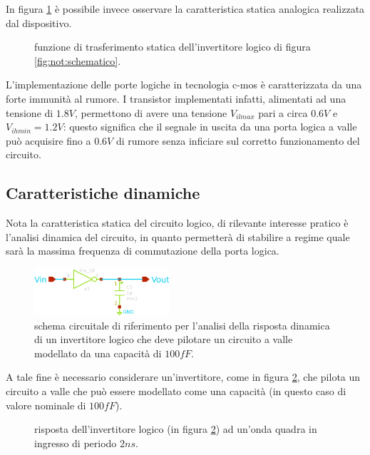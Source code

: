 	In figura \ref{fig:not:carattstatica} è possibile invece osservare la caratteristica statica analogica realizzata dal dispositivo.
	
	\begin{figure}[H]
		\centering
		
		\caption{funzione di trasferimento statica dell'invertitore logico di figura \ref{fig:not:schematico}.}
		\label{fig:not:carattstatica}
	\end{figure}

	L'implementazione delle porte logiche in tecnologia c-mos è caratterizzata da una forte immunità al rumore. I transistor implementati infatti, alimentati ad una tensione di $1.8V$, permettono di avere una tensione $V_{ilmax}$ pari a circa $0.6V$ e $V_{ihmin} = 1.2V$: questo significa che il segnale in uscita da una porta logica a valle può acquisire fino a $0.6V$ di rumore senza inficiare sul corretto funzionamento del circuito.
	
	\subsection*{Caratteristiche dinamiche}
		
		Nota la caratteristica statica del circuito logico, di rilevante interesse pratico è l'analisi dinamica del circuito, in quanto permetterà di stabilire a regime quale sarà la massima frequenza di commutazione della porta logica.
		
		\begin{figure}[bht]
			\centering
			\includegraphics[width=5cm]{Immagini/not-gate-carico}
			\caption{schema circuitale di riferimento per l'analisi della risposta dinamica di un invertitore logico che deve pilotare un circuito a valle modellato da una capacità di $100fF$.}
			\label{fig:not:dinamica-schema}
		\end{figure}
		
		A tale fine è necessario considerare un'invertitore, come in figura \ref{fig:not:dinamica-schema}, che pilota un circuito a valle che può essere modellato come una capacità (in questo caso di valore nominale di $100fF$).
	
		\begin{figure}[bht]
			\centering
			
			\caption{risposta dell'invertitore logico (in figura \ref{fig:not:dinamica-schema}) ad un'onda quadra in ingresso di periodo $2ns$.}
			\label{fig:not:dinamica}
		\end{figure}
		

